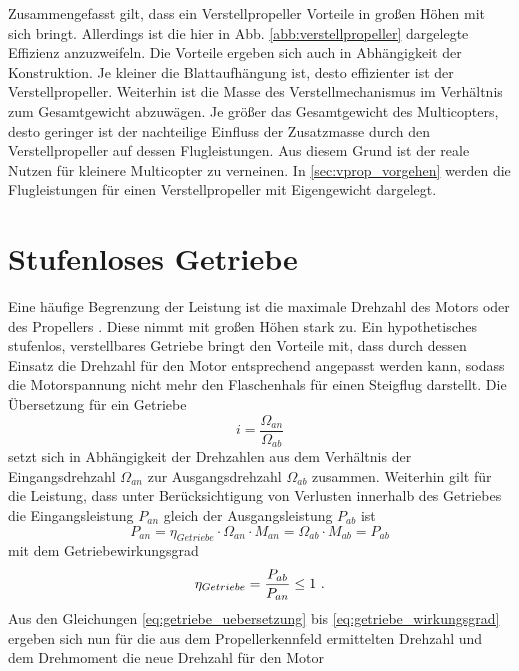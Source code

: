 Zusammengefasst gilt, dass ein Verstellpropeller Vorteile in großen Höhen mit sich bringt. Allerdings ist die hier in Abb. \ref{abb:verstellpropeller} dargelegte Effizienz anzuzweifeln. Die Vorteile ergeben sich auch in Abhängigkeit der Konstruktion. Je kleiner die Blattaufhängung ist, desto effizienter ist der Verstellpropeller. Weiterhin ist die Masse des Verstellmechanismus im Verhältnis zum Gesamtgewicht abzuwägen. Je größer das Gesamtgewicht des Multicopters, desto geringer ist der nachteilige Einfluss der Zusatzmasse durch den Verstellpropeller auf dessen Flugleistungen. Aus diesem Grund ist der reale Nutzen für kleinere Multicopter zu verneinen. 
In \ref{sec:vprop_vorgehen} werden die Flugleistungen für einen Verstellpropeller mit Eigengewicht dargelegt. 



\section{Stufenloses Getriebe}
\label{sec:getriebe}
Eine häufige Begrenzung der Leistung ist die maximale Drehzahl des Motors oder des Propellers 
. Diese nimmt mit großen Höhen stark zu. Ein hypothetisches stufenlos, verstellbares Getriebe bringt den Vorteile mit, dass durch dessen Einsatz die Drehzahl für den Motor entsprechend angepasst werden kann, sodass die Motorspannung nicht mehr den Flaschenhals für einen Steigflug darstellt.
Die Übersetzung für ein Getriebe 
\begin{equation}
	i = \frac{\Omega_{an}}{\Omega_{ab}} 
	\label{eq:getriebe_uebersetzung}
\end{equation}
setzt sich in Abhängigkeit der Drehzahlen aus dem Verhältnis der Eingangsdrehzahl \ensuremath{\Omega_{an}} zur Ausgangsdrehzahl \ensuremath{\Omega_{ab}} zusammen. Weiterhin gilt für die Leistung, dass unter Berücksichtigung von Verlusten innerhalb des Getriebes die Eingangsleistung \ensuremath{P_{an}} gleich der Ausgangsleistung \ensuremath{P_{ab}} ist
\begin{equation}
	P_{an} = \eta_{Getriebe} \cdot \Omega_{an}\cdot M_{an} = \Omega_{ab}\cdot M_{ab} = P_{ab}
	\label{eq:getriebe_leistung}
\end{equation} 
mit dem Getriebewirkungsgrad 
\begin{equation}
	\eta_{Getriebe} = \frac{P_{ab}}{P_{an}} \leq 1 ~\text{.}
	\label{eq:getriebe_wirkungsgrad}
\end{equation}
Aus den Gleichungen \ref{eq:getriebe_uebersetzung} bis \ref{eq:getriebe_wirkungsgrad} ergeben sich nun für die aus dem Propellerkennfeld ermittelten Drehzahl und dem Drehmoment die neue Drehzahl für den Motor
